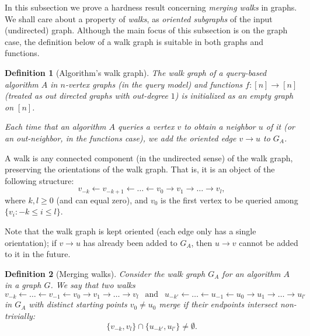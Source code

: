 \documentclass[11pt]{article}
\numberwithin{equation}{section}
\newtheorem{definition}[definition]{Definition}
\newcommand{\1}{\mathbf{1}}
\begin{document}
In this subsection we prove a hardness result concerning \emph{merging walks} in graphs. We shall care about a property of \emph{walks}, as \emph{oriented subgraphs} of the input (undirected) graph. Although the main focus of this subsection is on the graph case, the definition below of a walk graph is suitable in both graphs and functions.

\begin{definition}[Algorithm's walk graph]
\label{def:walk-graph}
The walk graph of a query-based algorithm $A$ in $n$-vertex graphs (in the query model) and functions $f \colon [n] \to [n]$ (treated as out directed graphs with out-degree $1$) is initialized as an empty graph on $[n]$. 

Each time that an algorithm $A$ queries a vertex $v$ to obtain a neighbor $u$ of it (or an out-neighbor, in the functions case), we add the oriented edge $v \to u$ to $G_A$. 
\end{definition}
A walk is any connected component (in the undirected sense) of the walk graph, preserving the orientations of the walk graph. That is, it is an object of the following structure:
$$
v_{-k} \leftarrow v_{-k+1} \leftarrow \ldots \leftarrow v_0 \rightarrow v_1 \rightarrow \ldots \rightarrow v_l,
$$
where $k,l \geq 0$ (and can equal zero), and $v_0$ is the first vertex to be queried among $\{v_i : -k \leq i \leq l\}$.

Note that the walk graph is kept oriented (each edge only has a single orientation); if $v \to u$ has already been added to $G_A$, then $u \to v$ cannot be added to it in the future.

\begin{definition}[Merging walks]
\label{def:merging_walks}
Consider the walk graph $G_A$ for an algorithm $A$ in a graph $G$. We say that two walks $$v_{-k} \leftarrow \ldots \leftarrow v_{-1} \leftarrow v_0 \to v_1 \to \ldots \to v_l \ \ \text{ and }\ \  u_{-k'} \leftarrow \ldots \leftarrow u_{-1} \leftarrow u_0 \to u_1 \to \ldots \to u_{l'}$$ 
in $G_A$ with distinct starting points $v_0 \neq u_0$ \emph{merge} if their endpoints intersect non-trivially: $$\{v_{-k}, v_l\} \cap \{u_{-k'}, u_{l'}\} \neq \emptyset.$$ 
\end{definition}
\end{document}
